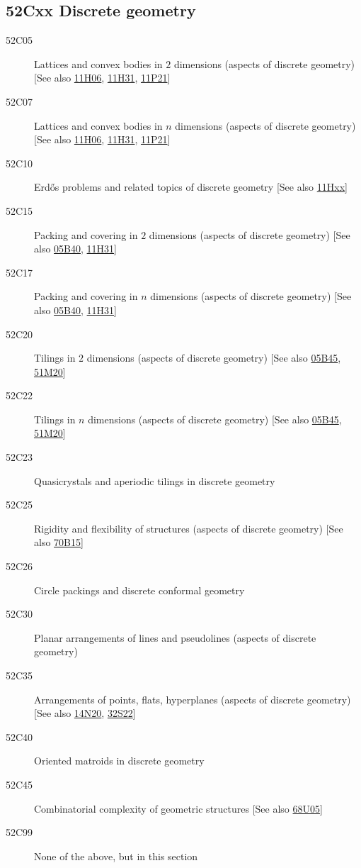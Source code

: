 \documentclass[letterpaper]{article}
\begin{document}
\subsection*{52Cxx  Discrete geometry }\label{52Cxx}
\begin{description}  
\item [52C05]\label{52C05} Lattices and convex bodies in $2$ dimensions (aspects of discrete geometry) [See also \hyperref[11H06]{11H06}, \hyperref[11H31]{11H31}, \hyperref[11P21]{11P21}]
\item [52C07]\label{52C07} Lattices and convex bodies in $n$ dimensions (aspects of discrete geometry) [See also \hyperref[11H06]{11H06}, \hyperref[11H31]{11H31}, \hyperref[11P21]{11P21}]
\item [52C10]\label{52C10} Erd\H{o}s problems and related topics of discrete geometry [See also \hyperref[11Hxx]{11Hxx}]
\item [52C15]\label{52C15} Packing and covering in $2$ dimensions (aspects of discrete geometry) [See also \hyperref[05B40]{05B40}, \hyperref[11H31]{11H31}]
\item [52C17]\label{52C17} Packing and covering in $n$ dimensions (aspects of discrete geometry) [See also \hyperref[05B40]{05B40}, \hyperref[11H31]{11H31}]
\item [52C20]\label{52C20} Tilings in $2$ dimensions (aspects of discrete geometry) [See also \hyperref[05B45]{05B45}, \hyperref[51M20]{51M20}]
\item [52C22]\label{52C22} Tilings in $n$ dimensions (aspects of discrete geometry) [See also \hyperref[05B45]{05B45}, \hyperref[51M20]{51M20}]
\item [52C23]\label{52C23} Quasicrystals and aperiodic tilings in discrete geometry
\item [52C25]\label{52C25} Rigidity and flexibility of structures (aspects of discrete geometry) [See also \hyperref[70B15]{70B15}]
\item [52C26]\label{52C26} Circle packings and discrete conformal geometry
\item [52C30]\label{52C30} Planar arrangements of lines and pseudolines (aspects of discrete geometry)
\item [52C35]\label{52C35} Arrangements of points, flats, hyperplanes (aspects of discrete geometry) [See also \hyperref[14N20]{14N20}, \hyperref[32S22]{32S22}]
\item [52C40]\label{52C40} Oriented matroids in discrete geometry
\item [52C45]\label{52C45} Combinatorial complexity of geometric structures [See also \hyperref[68U05]{68U05}]
\item [52C99]\label{52C99} None of the above, but in this section
\end{description}
\end{document}
